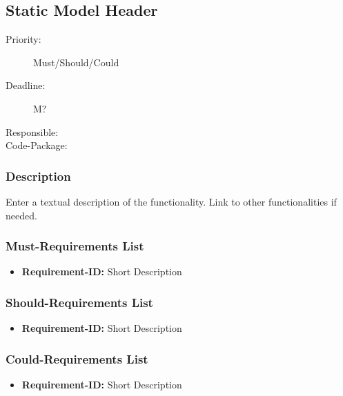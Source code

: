\subsection{Static Model Header}
\label{Functionality:ID}

\begin{description}
\item[Priority:] Must/Should/Could
\item[Deadline:] M?
\item[Responsible:]
\item[Code-Package:]
\end{description}

\subsubsection*{Description}

Enter a textual description of the functionality. Link to other functionalities if needed. 


\subsubsection*{Must-Requirements List}

\begin{itemize}
\item \textbf{Requirement-ID:} Short Description
\end{itemize}

\subsubsection*{Should-Requirements List}

\begin{itemize}
\item \textbf{Requirement-ID:} Short Description
\end{itemize}

\subsubsection*{Could-Requirements List}

\begin{itemize}
\item \textbf{Requirement-ID:} Short Description
\end{itemize}

